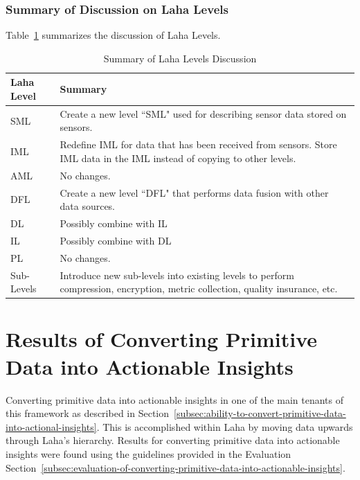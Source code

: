 \subsubsection{Summary of Discussion on Laha Levels}
Table~\ref{table:summary_of_levels} summarizes the discussion of Laha Levels.

\begin{table}[H]
    \centering
    \caption{Summary of Laha Levels Discussion}
    \begin{tabularx}{\textwidth}{lX}
        \toprule
        \textbf{Laha Level} & \textbf{Summary} \\
        \midrule
        SML & Create a new level ``SML" used for describing sensor data stored on sensors. \\
        IML & Redefine IML for data that has been received from sensors. Store IML data in the IML instead of copying to other levels. \\
        AML & No changes. \\
        DFL & Create a new level ``DFL" that performs data fusion with other data sources. \\
        DL & Possibly combine with IL \\
        IL & Possibly combine with DL \\
        PL & No changes. \\
        Sub-Levels & Introduce new sub-levels into existing levels to perform compression, encryption, metric collection, quality insurance, etc. \\
        \bottomrule
    \end{tabularx}
    \label{table:summary_of_levels}
\end{table}

\section{Results of Converting Primitive Data into Actionable Insights}\label{sec:results-of-converting-primitie-data-into-actional-insights}

Converting primitive data into actionable insights in one of the main tenants of this framework as described in Section~\ref{subsec:ability-to-convert-primitive-data-into-actional-insights}. This is accomplished within Laha by moving data upwards through Laha's hierarchy. Results for converting primitive data into actionable insights were found using the guidelines provided in the Evaluation Section~\ref{subsec:evaluation-of-converting-primitive-data-into-actionable-insights}.

